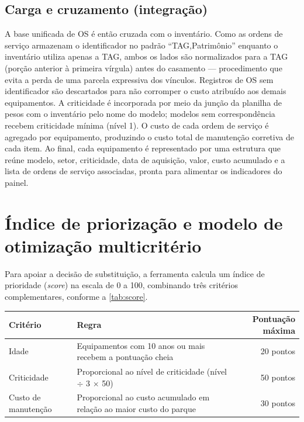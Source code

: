 \subsection*{Carga e cruzamento (integração)}

A base unificada de OS é então cruzada com o inventário. Como as ordens de
serviço armazenam o identificador no padrão ``TAG,Patrimônio'' enquanto o
inventário utiliza apenas a TAG, ambos os lados são normalizados para a TAG
(porção anterior à primeira vírgula) antes do casamento --- procedimento que
evita a perda de uma parcela expressiva dos vínculos. Registros de OS sem
identificador são descartados para não corromper o custo atribuído aos demais
equipamentos. A criticidade é incorporada por meio da junção da planilha de pesos
com o inventário pelo nome do modelo; modelos sem correspondência recebem
criticidade mínima (nível 1). O custo de cada ordem de serviço é agregado por
equipamento, produzindo o custo total de manutenção corretiva de cada item. Ao
final, cada equipamento é representado por uma estrutura que reúne modelo, setor,
criticidade, data de aquisição, valor, custo acumulado e a lista de ordens de
serviço associadas, pronta para alimentar os indicadores do painel.

\section{Índice de priorização e modelo de otimização multicritério}
\label{sec:score}

Para apoiar a decisão de substituição, a ferramenta calcula um índice de
prioridade (\textit{score}) na escala de 0 a 100, combinando três critérios
complementares, conforme a \ref{tab:score}.

\begin{table}[H]
    \centering
    \begin{tabular}{lp{7cm}r}
        \hline
        \textbf{Critério} & \textbf{Regra} & \textbf{Pontuação máxima} \\
        \hline
        Idade & Equipamentos com 10 anos ou mais recebem a pontuação cheia & 20 pontos \\
        Criticidade & Proporcional ao nível de criticidade (nível $\div$ 3 $\times$ 50) & 50 pontos \\
        Custo de manutenção & Proporcional ao custo acumulado em relação ao maior custo do parque & 30 pontos \\
        \hline
    \end{tabular}
\end{table}

